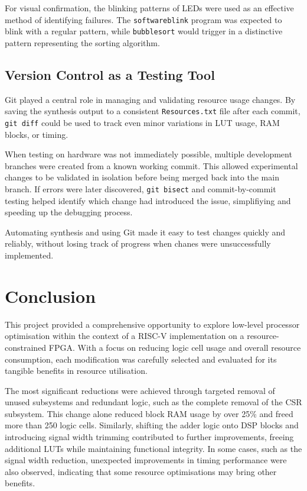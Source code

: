 \documentclass[a4paper,10pt]{article}
\begin{document}
For visual confirmation, the blinking patterns of LEDs were used as an
effective method of identifying failures.
The \texttt{softwareblink} program was expected to blink with a regular pattern, 
while \texttt{bubblesort} would trigger in a distinctive pattern 
representing the sorting algorithm.

\subsection*{Version Control as a Testing Tool}

Git played a central role in managing and validating resource usage changes. 
By saving the synthesis output to a consistent \texttt{Resources.txt} file 
after each commit, \texttt{git diff} could be used to track even minor variations 
in LUT usage, RAM blocks, or timing.

When testing on hardware was not immediately possible, 
multiple development branches were created from a known working commit. 
This allowed experimental changes to be validated in isolation 
before being merged back into the main branch. 
If errors were later discovered, \texttt{git bisect} and 
commit-by-commit testing helped identify which change had introduced the issue,
simplifiying and speeding up the debugging process.

Automating synthesis and using Git made it easy to test changes quickly and reliably, 
without losing track of progress when chanes were unsuccessfully implemented.

\section{Conclusion}
\label{sec:Conclusion}

This project provided a comprehensive opportunity to explore 
low-level processor optimisation within the context of a 
RISC-V implementation on a resource-constrained FPGA. 
With a focus on reducing logic cell usage and overall resource consumption, 
each modification was carefully selected and evaluated for its tangible benefits 
in resource utilisation.

The most significant reductions were achieved through targeted 
removal of unused subsystems and redundant logic,
such as the complete removal of the CSR subsystem. 
This change alone reduced block RAM usage by over 25\% and 
freed more than 250 logic cells.
Similarly, shifting the adder logic onto DSP blocks and 
introducing signal width trimming contributed to further improvements, 
freeing additional LUTs while maintaining functional integrity. 
In some cases, such as the signal width reduction, 
unexpected improvements in timing performance were also observed, 
indicating that some resource optimisations may bring other benefits.
\end{document}
